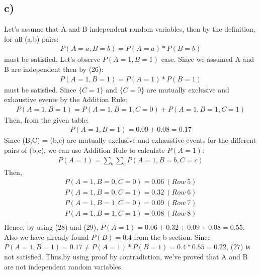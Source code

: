 \documentclass[12pt]{article}
\begin{document}
\subsection*{c)}Let's assume that A and B independent random variables, then by the definition, for all (a,b) pairs:
\begin{equation} 
\begin{split}
P(A=a,B=b) = P(A=a)*P(B=b)
\end{split}
\end{equation}
must be satisfied. Let's observe $P(A=1,B=1)$ case. Since we assumed A and B are independent then by (26):
\begin{equation} 
\begin{split}
P(A=1,B=1) = P(A=1)*P(B=1)
\end{split}
\end{equation}
must be satisfied. Since $\{C=1\}$ and $\{C=0\}$ are mutually exclusive and exhaustive events by the Addition Rule:
\begin{equation*} 
\begin{split}
P(A=1,B=1) = P(A=1,B=1,C=0) + P(A=1,B=1,C=1)
\end{split}
\end{equation*}
Then, from the given table:
\begin{equation*} 
\begin{split}
P(A=1,B=1) = 0.09+0.08 = 0.17
\end{split}
\end{equation*}
Since {(B,C) = (b,c)} are mutually exclusive and exhaustive events for the different pairs of (b,c), we can use Addition Rule to calculate $P(A=1)$:
\begin{equation} 
\begin{split}
P(A=1) = \sum_{b}\sum_{c}P(A=1,B=b,C=c)
\end{split}
\end{equation}
Then,
\begin{equation} 
\begin{split}
P(A=1,B=0,C=0) = 0.06 \ (Row \ 5) \\
P(A=1,B=0,C=1) = 0.32 \ (Row \ 6) \\
P(A=1,B=1,C=0) = 0.09 \ (Row \ 7) \\
P(A=1,B=1,C=1) = 0.08 \ (Row \ 8) \\
\end{split}
\end{equation}
Hence, by using (28) and (29), $P(A=1) = 0.06 + 0.32 + 0.09+ 0.08 = 0.55$. Also we have already found $P(B) = 0.4$ from the b section. Since $P(A=1,B=1) = 0.17 \neq P(A=1)*P(B=1) = 0.4*0.55 = 0.22$, (27) is not satisfied. Thus,by using proof by contradiction, we've proved that A and B are not independent random variables.
\end{document}
